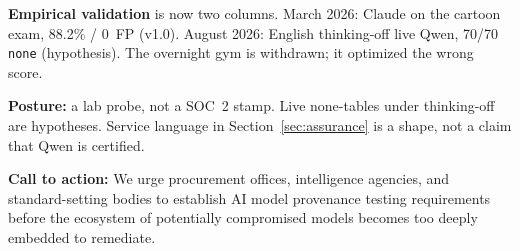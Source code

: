 \documentclass[11pt]{article}
\begin{document}
\textbf{Empirical validation} is now two columns. March 2026: Claude
on the cartoon exam, 88.2\% / 0~FP (v1.0). August 2026: English
thinking-off live Qwen, 70/70 \texttt{none} (hypothesis). The overnight
gym is withdrawn; it optimized the wrong score.

\textbf{Posture:} a lab probe, not a SOC~2 stamp. Live none-tables under
thinking-off are hypotheses. Service language in Section~\ref{sec:assurance}
is a shape, not a claim that Qwen is certified.

\textbf{Call to action:} We urge procurement offices, intelligence agencies,
and standard-setting bodies to establish AI model provenance testing requirements
before the ecosystem of potentially compromised models becomes too deeply
embedded to remediate.

\newpage
\end{document}

